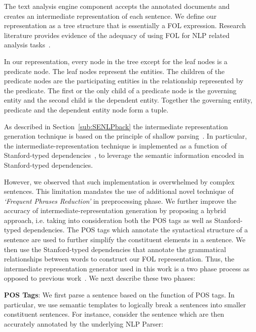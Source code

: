 The text analysis engine component accepts the annotated documents and creates an intermediate representation of each sentence.
We define our representation as a tree structure that is essentially a FOL expression.
Research literature provides evidence of the adequacy of using FOL for NLP related analysis tasks~\cite{Sinha2009,Sinha2010,pandita12:inferring, pandita13:WHYPER}.

In our representation, every node in the tree except for the leaf nodes is a predicate node. 
The leaf nodes represent the entities.
The children of the predicate nodes are the participating entities in the relationship represented by the predicate.
The first or the only child of a predicate node is the governing entity and the second child is the dependent entity.
Together the governing entity, predicate and the dependent entity node form a tuple.  


As described in Section~\ref{sub:SENLPback} the intermediate representation generation technique is based on the principle of shallow parsing~\cite{Branimir2000}. 
In particular, the intermediate-representation technique is implemented as a function of Stanford-typed dependencies~\cite{Marneffe06LREC,Marneffe08COLING,KleinNIPS03}, to leverage the semantic information encoded in Stanford-typed dependencies.


However, we observed that such implementation is overwhelmed by complex sentences.
This limitation mandates the use of additional novel technique of \textit{`Frequent Phrases Reduction'} in preprocessing phase.
We further improve the accuracy of intermediate-representation generation by proposing a hybrid approach, i.e. taking into consideration both the POS tags as well as Stanford-typed dependencies.
The POS tags which annotate the syntactical structure of a sentence are used to further simplify the constituent elements in a sentence. 
We then use the Stanford-typed dependencies that annotate the grammatical relationships between words to construct our FOL representation.
Thus, the intermediate representation generator used in this work is a two phase process as opposed to previous work~\cite{pandita12:inferring, pandita13:WHYPER}. 
We next describe these two phases:

\textbf{POS Tags}: We first parse a sentence based on the function of POS tags. 
In particular, we use semantic templates to logically break a sentences into smaller constituent sentences. 
For instance, consider the sentence which are then accurately annotated by the underlying NLP Parser:

